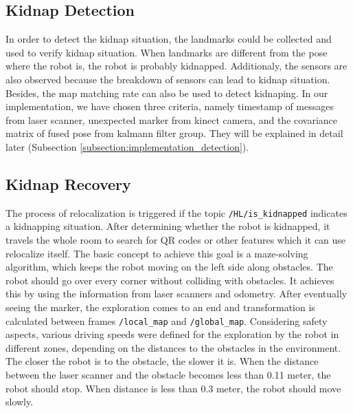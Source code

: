 \subsection{Kidnap Detection}
In order to detect the kidnap situation, the landmarks could be collected and used to verify kidnap situation. When landmarks are different from the pose where the robot is, the robot is probably kidnapped. Additionaly, the sensors are also observed because the breakdown of sensors can lead to kidnap situation. Besides, the map matching rate can also be used to detect kidnaping. In our implementation, we have chosen three criteria, namely timestamp of messages from laser scanner, unexpected marker from kinect camera, and the covariance matrix of fused pose from kalmann filter group. They will be explained in detail later (Subsection \ref{subsection:implementation_detection}).  
\subsection{Kidnap Recovery}
The process of relocalization is triggered if the topic \texttt{/HL/is\_kidnapped} indicates a kidnapping situation. After determining whether the robot is kidnapped, it travels the whole room to search for QR codes or other features which it can use relocalize itself. The basic concept to achieve this goal is a maze-solving algorithm, which keeps the robot moving on the left side along obstacles. The robot should go over every corner without colliding with obstacles. It achieves this by using the information from laser scanners and odometry. After eventually seeing the marker, the exploration comes to an end and transformation is calculated between frames \texttt{/local\_map} and \texttt{/global\_map}. Considering safety aspects, various driving speeds were defined for the exploration by the robot in different zones, depending on the distances to the obstacles in the environment. The closer the robot is to the obstacle, the slower it is. When the distance between the laser scanner and the obstacle becomes less than 0.11 meter, the robot should stop. When distance is less than 0.3 meter, the robot should move slowly.

%

